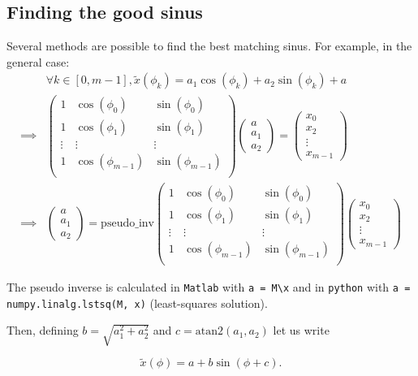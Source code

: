 \documentclass[12pt,a4paper]{article}
\begin{document}
	\subsection{Finding the good sinus}
	Several methods are possible to find the best matching sinus. For example, in the general case:
	\begin{align}
		&\forall k \in [0,m-1], \tilde{x}(\phi_k) = a_1 \cos(\phi_k) + a_2 \sin(\phi_k) + a \nonumber \\
		\implies &
		\begin{pmatrix}
			1 & \cos(\phi_0) & \sin(\phi_0) \\
			1 & \cos(\phi_1) & \sin(\phi_1) \\
			\vdots & \vdots & \vdots \\
			1 & \cos(\phi_{m-1}) & \sin(\phi_{m-1}) \\
		\end{pmatrix}
		\begin{pmatrix}
			a \\ a_1 \\ a_2
		\end{pmatrix}
		=
		\begin{pmatrix}
			x_0 \\ x_2 \\ \vdots \\ x_{m-1}
		\end{pmatrix} \nonumber
		\\
		\implies &
		\begin{pmatrix}
		a \\ a_1 \\ a_2
		\end{pmatrix}
		= 
		\mathrm{pseudo\_inv}
		\begin{pmatrix}
		1 & \cos(\phi_0) & \sin(\phi_0) \\
		1 & \cos(\phi_1) & \sin(\phi_1) \\
		\vdots & \vdots & \vdots \\
		1 & \cos(\phi_{m-1}) & \sin(\phi_{m-1}) \\
		\end{pmatrix}
		\begin{pmatrix}
		x_0 \\ x_2 \\ \vdots \\ x_{m-1}
		\end{pmatrix}
	\end{align}
		
	The pseudo inverse is calculated in \texttt{Matlab} with \texttt{a = M\textbackslash x} and in \texttt{python} with \texttt{a = numpy.linalg.lstsq(M, x)} (least-squares solution).
	
	Then, defining $b = \sqrt{a_1^2+a_2^2}$ and $c = \mathrm{atan2}(a_1, a_2)$ let us write
	
	\begin{equation*}
		\tilde{x}(\phi) = a + b \sin(\phi + c).
	\end{equation*} 
		
	
	
	
\end{document}
